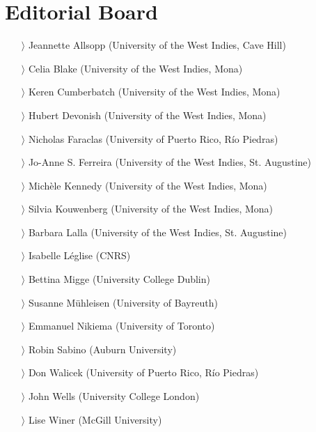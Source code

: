\documentclass[
notumble,
nofoldmark,
]{leaflet}
\begin{document}
{    \section{Editorial Board }   
    \begin{itemize}
    \item[$\rangle$] Jeannette Allsopp (University of the West Indies, Cave Hill)
    \item[$\rangle$] Celia Blake (University of the West Indies, Mona)
    \item[$\rangle$] Keren Cumberbatch (University of the West Indies, Mona)
    \item[$\rangle$] Hubert Devonish (University of the West Indies, Mona)
    \item[$\rangle$] Nicholas Faraclas (University of Puerto Rico, R\'io Piedras)
    \item[$\rangle$] Jo-Anne S. Ferreira (University of the West Indies, St. Augustine)
    \item[$\rangle$] Mich\`ele Kennedy (University of the West Indies, Mona)
    \item[$\rangle$] Silvia Kouwenberg (University of the West Indies, Mona)
    \item[$\rangle$] Barbara Lalla (University of the West Indies, St. Augustine)
    \item[$\rangle$] Isabelle L\'eglise (CNRS)
    \item[$\rangle$] Bettina Migge (University College Dublin)
    \item[$\rangle$] Susanne M\"uhleisen (University of Bayreuth)
    \item[$\rangle$] Emmanuel Nikiema (University of Toronto)
    \item[$\rangle$] Robin Sabino (Auburn University)
    \item[$\rangle$] Don Walicek (University of Puerto Rico, Río Piedras)
    \item[$\rangle$] John Wells (University College London)
    \item[$\rangle$] Lise Winer (McGill University)
    \end{itemize}
}
\end{document}
